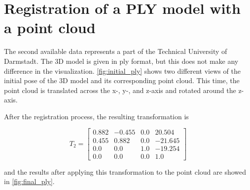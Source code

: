     \section{Registration of a PLY model with a point cloud}

        The second available data represents a part of the Technical University of Darmstadt.
        The 3D model is given in ply format, but this does not make any difference in the visualization.
        \autoref{fig:initial_ply} shows two different views of the initial pose of the 3D model and its corresponding point cloud.
        This time, the point cloud is translated across the x-, y-, and z-axis and rotated around the z-axis. 
        
        After the registration process, the resulting transformation is

        \begin{equation*}
            T_2 = 
            \begin{bmatrix}
                0.882 & -0.455 & 0.0 & 20.504 \\ 
                0.455 & 0.882 & 0.0 & -21.645 \\
                0.0 & 0.0 & 1.0 & -19.254 \\
                0.0 & 0.0 & 0.0 & 1.0
            \end{bmatrix}    
        \end{equation*}
        
        and the results after applying this transformation to the point cloud are showed in \autoref{fig:final_ply}.
        

